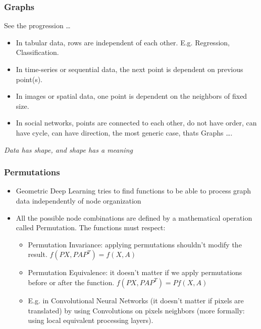 \begin{frame}[fragile]\frametitle{Graphs}

See the progression \ldots

\begin{itemize}
\item In tabular data, rows are independent of each other. E.g. Regression, Classification.
\item In time-series or sequential data, the next point is dependent on previous point(s).
\item In images or spatial data, one point is dependent on the neighbors of fixed size.
\item In social networks, points are connected to each other, do not have order, can have cycle, can have direction, the most generic case, thats Graphs \ldots.
\end{itemize}
	
	{\em Data has shape, and shape has a meaning}
	


\end{frame}




\begin{frame}[fragile]\frametitle{Permutations}

\begin{itemize}
\item  Geometric Deep Learning tries to find functions to be  able to process graph data independently of node organization

\item  All the possible node combinations are defined by a mathematical operation called Permutation. The functions must respect: 
\begin{itemize}
\item Permutation Invariance: applying permutations shouldn’t modify the result. $f(PX,PAP^T )=f(X,A)$
\item Permutation Equivalence: it doesn’t matter if we apply permutations before or after the function. $f(PX, PAP^T)=Pf(X, A)$
\item E.g. in Convolutional Neural Networks (it doesn't matter if pixels are translated) by using Convolutions on pixels neighbors (more formally: using local equivalent processing layers).
\end{itemize}
	\end{itemize}


\end{frame}

